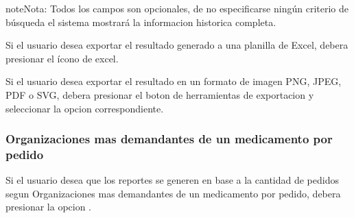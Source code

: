 \documentclass[a4paper,10pt,spanish]{sphinxmanual}
\begin{document}




\begin{notice}{note}{Nota:}
Todos los campos son opcionales, de no especificarse ningún criterio de búsqueda el sistema mostrará la informacion historica completa.
\end{notice}


Si el usuario desea exportar el resultado generado a una planilla de Excel, debera presionar el ícono de excel.


Si el usuario desea exportar el resultado en un formato de imagen PNG, JPEG, PDF o SVG, debera presionar el boton de herramientas de exportacion y seleccionar la opcion correspondiente.



\subsubsection{Organizaciones mas demandantes de un medicamento por pedido}
\label{medicams:organizaciones-mas-demandantes-de-un-medicamento-por-pedido}\label{medicams:org-ped-pc}
Si el usuario desea que los reportes se generen en base a la cantidad de pedidos segun Organizaciones mas demandantes de un medicamento por pedido, debera presionar la opcion .
\end{document}
